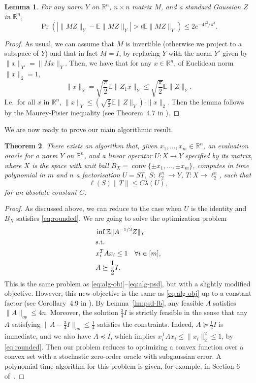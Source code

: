 \documentclass[11pt]{article}
\newtheorem{theorem}{Theorem}
\newtheorem{lemma}[theorem]{Lemma}
\newcommand{\R}{{\mathbb{R}}}
\newcommand{\E}{\mathbb{E}}
\newcommand{\T}{\mathsf T}
\DeclareMathOperator{\conv}{conv}
\begin{document}
\begin{lemma}\label{lm:concentr}
  For any norm $Y$ on $\R^n$, $n\times n$ matrix $M$, and a
  standard Gaussian $Z$ in $\R^n$,
  \[
  \Pr(|\|MZ\|_Y - \E \|MZ\|_Y| > t \E \|MZ\|_Y) \le 2e^{-4t^2/\pi^3}.
  \]
\end{lemma}
\begin{proof}
  As  usual, we can assume that $M$ is invertible (otherwise we
  project to a subspace of $Y$) and that in fact $M = I$, by replacing
  $Y$ with the norm $Y'$ given by $\|x\|_{Y'} = \|Mx\|_Y$. Then, we
  have that for any $x \in \R^n$, of Euclidean norm $\|x\|_2 = 1$,
  \[
  \|x\|_Y = \sqrt{\frac{\pi}{2}}\E\|Z_1 x\|_Y 
  \le \sqrt{\frac{\pi}{2}} \E\|Z\|_Y.
  \]
  I.e.~for all $x$ in $\R^n$, $\|x\|_Y \le
  \left(\sqrt{\frac{\pi}{2}}\E\|Z\|_Y\right)\cdot \|x\|_2$. Then the lemma follows by
  the Maurey-Pisier inequality (see Theorem~4.7 in \cite{Pisier-book}).
\end{proof}

We are now ready to prove our main algorithmic result. 
\begin{theorem}\label{thm:alg}
  There exists an algorithm that, given $x_1, \ldots, x_m \in \R^n$,
  an evaluation oracle for a norm $Y$ on $\R^n$, and
  a linear operator $U:X \to Y$ specified by its matrix, where $X$ is
  the space with unit ball $B_X = \conv\{\pm x_1, \ldots, \pm x_m\}$,
  computes in time polynomial in $m$ and $n$ a factorisation $U = ST$,
  $S:\ell_2^n \to Y$, $T:X \to \ell_2^n$,  such that 
  \[
  \ell(S) \|T\| \le C\lambda(U),
  \]
  for an absolute constant $C$.
\end{theorem}
\begin{proof}
  As discussed above, we can reduce to the case when $U$ is the
  identity and $B_X$ satisfies \eqref{eq:rounded}. We are going to
  solve the optimization problem
  \begin{align*}
    &\inf  \E\|A^{-1/2} Z\|_Y\\
    &\text{s.t.}\notag\\
    &x_i^T A x_i \le 1 \ \ \ \forall i \in [m],\\
    &A \succeq \frac12 I.
  \end{align*}
  This is the same problem as \eqref{eq:alg-obj}--\eqref{eq:alg-psd},
  but with a slightly modified objective. However, this new objective
  is the same as \eqref{eq:alg-obj} up to a constant factor (see
  Corollary~4.9 in \cite{Pisier-book}). By Lemma~\ref{lm:psd-lb}, any
  feasible $A$ satisfies $\|A\|_{op} \le 4n$. Moreover, the solution
  $\frac34 I$ is strictly feasible in the sense that any $A$
  satisfying $\|A - \frac34 I\|_{op} \le \frac14$ satisfies the
  constraints. Indeed, $A \succeq \frac12 I$ is immediate, and we also
  have $A \preceq I$, which implies $x_i^\T A x_i  \le \|x_i\|_2^2 \le
  1$, by \eqref{eq:rounded}. Then our problem reduces to optimizing a
  convex function over a convex set with a stochastic zero-order
  oracle with subgaussian error. A polynomial time algorithm for this
  problem is given, for example, in Section 6 of~\cite{BelloniLNR15}.
\end{proof}
\end{document}
